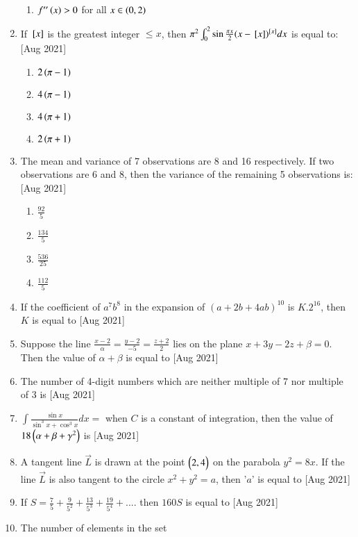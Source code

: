 \documentclass[journal]{IEEEtran}
\begin{document}
\begin{enumerate}
\begin{enumerate}
			\item  $f^{\prime\prime}\left(x\right) > 0$ for all $x \in \left(0, 2\right)$
		\end{enumerate}
	\item 
	If ${}\left[x\right]$ is the greatest integer $\leq x$, then $\pi^{2}\int_{0}^{2} \sin{\frac{\pi x}{2}}(x-{}\left[x\right])^{{}\left[x\right]} dx$ is equal to:
	\hfill [Aug 2021]
		\begin{enumerate}
			\item $2\left(\pi-1\right)$
			\item $4\left(\pi-1\right)$
			\item $4\left(\pi+1\right)$
			\item $2\left(\pi+1\right)$
		\end{enumerate}
	\item 
	The mean and variance of 7 observations are 8 and 16 respectively. If two observations are 6 and 8, then the variance of the remaining 5 observations is:
	\hfill [Aug 2021]
		\begin{enumerate}
			\item $\frac{92}{5}$
			\item $\frac{134}{5}$
			\item $\frac{536}{25}$
			\item $\frac{112}{5}$
		\end{enumerate}
    \item 
    If the coefficient of $a^{7}b^{8}$ in the expansion of $(a + 2b + 4ab)^{10}$ is $K.2^{16}$, then $K$ is equal to
    \hfill [Aug 2021]
    \item
	Suppose the line $\frac{x-2}{\alpha} = \frac{y-2}{-5} = \frac{z+2}{2}$ lies on the plane  $x + 3y - 2z + \beta = 0$. Then the value of $\alpha + \beta$ is equal to 
	\hfill [Aug 2021]
	\item 
	The number of 4-digit numbers which are neither multiple of 7 nor multiple of 3 is 
	\hfill [Aug 2021]
	\item 
	$\int \frac{\sin{x}}{\sin^3{x} + \cos^3{x}} dx =$ when $C$ is a constant of integration, then the value of $18\left(\alpha+\beta+\gamma^{2}\right)$ is
	\hfill [Aug 2021]
	\item
	A tangent line $\vec{L}$ is drawn at the point $\begin{pmatrix}2 , 4\end{pmatrix}$ on the parabola $y^{2}= 8x$. If the line $\vec{L}$ is also tangent to the circle $x^2 + y^2 = a$, then '$a$' is equal to
	\hfill [Aug 2021]
	\item 
	If $S=\frac{7}{5} + \frac{9}{5^{2}} + \frac{13}{5^{3}} + \frac{19}{5^{4}} + ....$ then $160S$ is equal to 
	\hfill [Aug 2021]
	\item 
	The number of elements in the set  \\
	

\end{enumerate}
\end{document}
